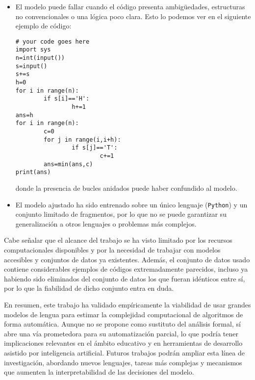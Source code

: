 \documentclass[12pt,twoside]{article}
\begin{document}
\begin{itemize}
    \item El modelo puede fallar cuando el código presenta ambigüedades, estructuras no convencionales o una lógica poco clara. Esto lo podemos ver en el siguiente ejemplo de código:

    \begin{tcolorbox}[
        colback=gray!5,
        colframe=black,
        boxrule=0.5pt,
        breakable,
        title=$\mathcal{O}(n)$ catalogado como $\mathcal{O}(n^2)$ con ajuste fino de 2 épocas,
    ]
    \begin{verbatim}
# your code goes here
import sys
n=int(input())
s=input()
s+=s
h=0
for i in range(n):
        if s[i]=='H':
                h+=1
ans=h
for i in range(n):
        c=0
        for j in range(i,i+h):
                if s[j]=='T':
                        c+=1
        ans=min(ans,c)
print(ans)
    \end{verbatim}
    \end{tcolorbox}

    donde la presencia de bucles anidados puede haber confundido al modelo.
    
    \item El modelo ajustado ha sido entrenado sobre un único lenguaje (\texttt{Python}) y un conjunto limitado de fragmentos, por lo que no se puede garantizar su generalización a otros lenguajes o problemas más complejos.
\end{itemize}

Cabe señalar que el alcance del trabajo se ha visto limitado por los recursos computacionales disponibles y por la necesidad de trabajar con modelos accesibles y conjuntos de datos ya existentes. Además, el conjunto de datos usado contiene considerables ejemplos de códigos extremadamente parecidos, incluso ya habiendo sido eliminados del conjunto de datos los que fueran idénticos entre sí, por lo que la fiabilidad de dicho conjunto entra en duda.

En resumen, este trabajo ha validado empíricamente la viabilidad de usar grandes modelos de lengua para estimar la complejidad computacional de algoritmos de forma automática. Aunque no se propone como sustituto del análisis formal, sí abre una vía prometedora para su automatización parcial, lo que podría tener implicaciones relevantes en el ámbito educativo y en herramientas de desarrollo asistido por inteligencia artificial. Futuros trabajos podrán ampliar esta línea de investigación, abordando nuevos lenguajes, tareas más complejas y mecanismos que aumenten la interpretabilidad de las decisiones del modelo.
\end{document}
